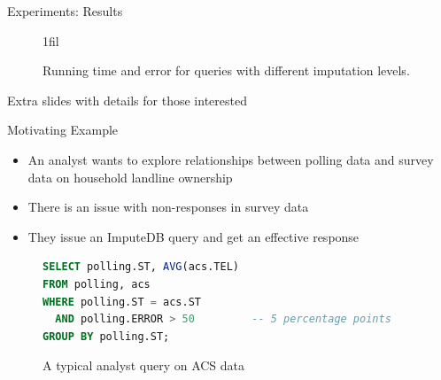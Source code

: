 \documentclass{beamer}
\makeatletter
\newcommand*{\centerfloat}{%
  \parindent \z@
  \leftskip \z@ \@plus 1fil \@minus \textwidth
  \rightskip\leftskip
  \parfillskip \z@skip}
\makeatother
\begin{document}
\begin{frame}[fragile]{Experiments: Results}
\begin{figure}
  \tiny
  \centerfloat
  
  \caption{Running time and error for queries with different imputation levels.}
  \label{fig:experiments}
\end{figure}
\end{frame}

\begin{frame}
	\center
	Extra slides with details for those interested
\end{frame}

\begin{frame}[fragile]{Motivating Example}
\begin{itemize}
	\item An analyst wants to explore relationships between polling data and survey data on household landline ownership
	\item There is an issue with non-responses in survey data
	\item They issue an ImputeDB query and get an effective response
\end{itemize}

\begin{figure}
\begin{lstlisting}[language=SQL]
SELECT polling.ST, AVG(acs.TEL)
FROM polling, acs
WHERE polling.ST = acs.ST
  AND polling.ERROR > 50         -- 5 percentage points
GROUP BY polling.ST;
\end{lstlisting}
\caption{A typical analyst query on ACS data}
\label{fig:example-query}
\end{figure}
\end{frame}
\end{document}
